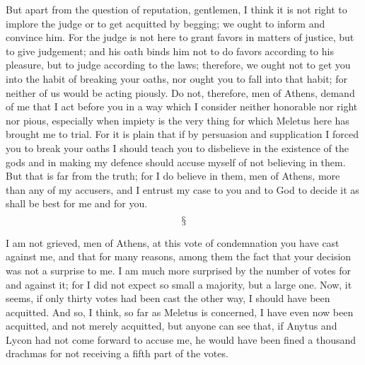 \documentclass[letterpaper,12pt]{article}
\newcommand{\stephpag}[1]{\marginnote{\small\itshape\fontfamily{ppl}\selectfont #1}}
\begin{document}
But apart from the question of reputation, gentlemen, I think it is not right \stephpag{c} to implore the judge or to get acquitted by begging; we ought to inform and convince him. For the judge is not here to grant favors in matters of justice, but to give judgement; and his oath binds him not to do favors according to his pleasure, but to judge according to the laws; therefore, we ought not to get you into the habit of breaking your oaths, nor ought you to fall into that habit; for neither of us would be acting piously. Do not, therefore, men of Athens, demand of me that I act before you in a way which I consider neither honorable nor right nor pious, \stephpag{d} especially when impiety is the very thing for which Meletus here has brought me to trial. For it is plain that if by persuasion and supplication I forced you to break your oaths I should teach you to disbelieve in the existence of the gods and in making my defence should accuse myself of not believing in them. But that is far from the truth; for I do believe in them, men of Athens, more than any of my accusers, and I entrust my case to you and to God to decide it as shall be best for me and for you.
\[\mathsection\]

\stephpag{e} I am not grieved, men of Athens, \stephpag{36 a} at this vote of condemnation you have cast against me, and that for many reasons, among them the fact that your decision was not a surprise to me. I am much more surprised by the number of votes for and against it; for I did not expect so small a majority, but a large one. Now, it seems, if only thirty votes had been cast the other way, I should have been acquitted. And so, I think, so far as Meletus is concerned, I have even now been acquitted, and not merely acquitted, but anyone can see that, if Anytus and Lycon had not come forward to accuse me, he would have been fined \stephpag{b} a thousand drachmas for not receiving a fifth part of the votes.
\end{document}

